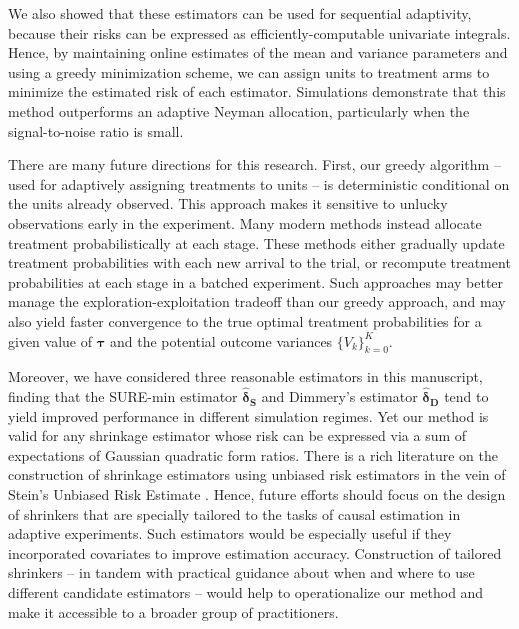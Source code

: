 \documentclass{article}
\newcommand{\bstau}{\boldsymbol \tau}
\newcommand{\bsdeltad}{\boldsymbol{\hat \delta_{\textbf{D}}}}
\newcommand{\bsdelts}{\boldsymbol {\hat \delta_S}}
\begin{document}
We also showed that these estimators can be used for sequential adaptivity, because their risks can be expressed as efficiently-computable univariate integrals. 
Hence, by maintaining online estimates of the mean and variance parameters and using a greedy minimization scheme, we can assign units to treatment arms to minimize the estimated risk of each estimator. Simulations demonstrate that this method outperforms an adaptive Neyman allocation, particularly when the signal-to-noise ratio is small. 

There are many future directions for this research. First, our greedy algorithm -- used for adaptively assigning treatments to units -- is deterministic conditional on the units already observed. This approach makes it sensitive to unlucky observations early in the experiment. Many modern methods \citep[e.g.]{dai2023clip, LiOwen2024} instead allocate treatment probabilistically at each stage. These methods either gradually update treatment probabilities with each new arrival to the trial, or recompute treatment probabilities at each stage in a batched experiment. Such approaches may better manage the exploration-exploitation tradeoff than our greedy approach, and may also yield faster convergence to the true optimal treatment probabilities for a given value of $\bstau$ and the potential outcome variances $\{V_k\}_{k = 0}^K$. 

Moreover, we have considered three reasonable estimators in this manuscript, finding that the SURE-min estimator $\bsdelts$ and Dimmery's estimator $\bsdeltad$ tend to yield improved performance in different simulation regimes. Yet our method is valid for any shrinkage estimator whose risk can be expressed via a sum of expectations of Gaussian quadratic form ratios. There is a rich literature on the construction of shrinkage estimators using unbiased risk estimators in the vein of Stein's Unbiased Risk Estimate \citep{li1985stein, xie2012estimating, donoho1995adapting}. Hence, future efforts should focus on the design of shrinkers that are specially tailored to the tasks of causal estimation in adaptive experiments. Such estimators would be especially useful if they incorporated covariates to improve estimation accuracy. Construction of tailored shrinkers -- in tandem with practical guidance about when and where to use different candidate estimators -- would help to operationalize our method and make it accessible to a broader group of practitioners. 


\end{document}
